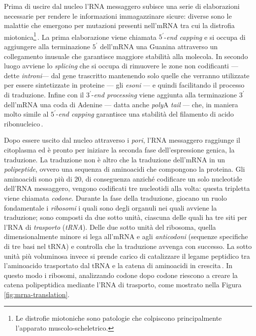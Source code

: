Prima di uscire dal nucleo l'RNA messaggero subisce una serie di elaborazioni necessarie per rendere le informazioni immagazzinare sicure: diverse sono le malattie che emergono per mutazioni presenti nell'mRNA tra cui la distrofia miotonica\footnote{Le distrofie miotoniche sono patologie che colpiscono principalmente l'apparato muscolo-scheletrico.}\,\cite{philips2000rna}. La prima elaborazione viene chiamata $5^\prime$-\textit{end capping} e si occupa di aggiungere alla terminazione $5^\prime$ dell'mRNA una Guanina attraverso un collegamento inusuale che garantisce maggiore stabilità alla molecola. In secondo luogo avviene lo \textit{splicing} che si occupa di rimuovere le zone non codificanti — dette \textsl{introni}— dal gene trascritto mantenendo solo quelle che verranno utilizzate per essere sintetizzate in proteine — gli \textsl{esoni} — e quindi facilitando il processo di traduzione. Infine con il $3^\prime$-\textit{end processing} viene aggiunta alla terminazione $3^\prime$ dell'mRNA una coda di Adenine — datta anche \textit{poly}A \textit{tail} — che, in maniera molto simile al $5^\prime$-\textit{end capping} garantisce una stabilità del filamento di acido ribonucleico\,\cite{hocine2010rna, livingstone2010mechanisms}.

Dopo essere uscito dal nucleo attraverso i \textsl{pori}, l'RNA messaggero raggiunge il citoplasma ed è pronto per iniziare la seconda fase dell'espressione genica, la traduzione. La traduzione non è altro che la traduzione dell'mRNA in un \textsl{polipeptide}, ovvero una sequenza di aminoacidi che compongono la proteina. Gli aminoacidi sono più di 20, di conseguenza anziché codificare un solo nucleotide dell'RNA messaggero, vengono codificati tre nucleotidi alla volta: questa tripletta viene chiamata \textsl{codone}. Durante la fase della traduzione, giocano un ruolo fondamentale i \textsl{ribosomi} i quali sono degli organuli nei quali avviene la traduzione; sono composti da due sotto unità, ciascuna delle quali ha tre siti per l'RNA di \textsl{trasporto} (\textsl{tRNA}). Delle due sotto unità del ribosoma, quella dimensionalmente minore si lega all'mRNA e agli \textsl{anticodoni} (sequenze specifiche di tre basi nel tRNA) e controlla che la traduzione avvenga con successo. La sotto unità più voluminosa invece si prende carico di catalizzare il legame peptidico tra l'aminoacido trasportato dal tRNA e la catena di aminoacidi in crescita\,\cite{ramakrishnan2002ribosome, lemonniermarathon, livingstone2010mechanisms}. In questo modo i ribosomi, analizzando codone dopo codone riescono a creare la catena polipeptidica mediante l'RNA di trasporto, come mostrato nella Figura\,\ref{fig:mrna-translation}.

